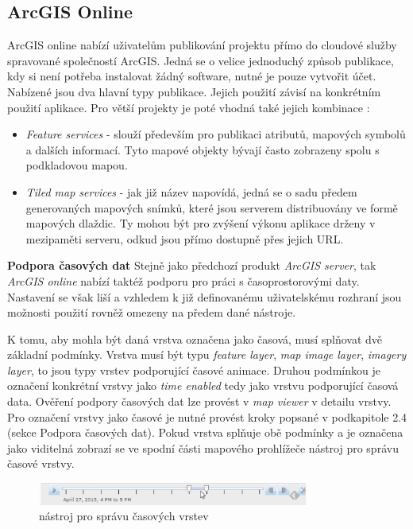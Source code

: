 \subsection{ArcGIS Online}

ArcGIS online nabízí uživatelům publikování projektu přímo do cloudové služby spravované společností ArcGIS. Jedná se o velice jednoduchý způsob publikace, kdy si není potřeba instalovat žádný software, nutné je pouze vytvořit účet. Nabízené jsou dva hlavní typy publikace. Jejich použití závisí na konkrétním použití aplikace. Pro větší projekty je poté vhodná také jejich kombinace \cite{arcgis-publishing-service}:
\begin{itemize}
	\item \textit{Feature services} - slouží především pro publikaci atributů, mapových symbolů a dalších informací. Tyto mapové objekty bývají často zobrazeny spolu s podkladovou mapou.
	\item \textit{Tiled map services} - jak již název napovídá, jedná se o sadu předem generovaných mapových snímků, které jsou serverem distribuovány ve formě mapových dlaždic. Ty mohou být pro zvýšení výkonu aplikace drženy v mezipaměti serveru, odkud jsou přímo dostupně přes jejich URL.
\end{itemize}

\bigskip
\noindent
\textbf{Podpora časových dat}
Stejně jako předchozí produkt \textit{ArcGIS server}, tak \textit{ArcGIS online} nabízí taktéž podporu pro práci s časoprostorovými daty. Nastavení se však liší a vzhledem k již definovanému uživatelskému rozhraní jsou možnosti použití rovněž omezeny na předem dané nástroje.

K tomu, aby mohla být daná vrstva označena jako časová, musí splňovat dvě základní podmínky. Vrstva musí být typu \textit{feature layer}, \textit{map image layer}, \textit{imagery layer}, to jsou typy vrstev podporující časové animace. Druhou podmínkou je označení konkrétní vrstvy jako \textit{time enabled} tedy jako vrstvu podporující časová data. Ověření podpory časových dat lze provést v \textit{map viewer} v detailu vrstvy. Pro označení vrstvy jako časové je nutné provést kroky popsané v podkapitole 2.4 (sekce Podpora časových dat). Pokud vrstva splňuje obě podmínky a je označena jako viditelná zobrazí se ve spodní části mapového prohlížeče nástroj pro správu časové vrstvy.

\begin{figure}[h!]
	\centering
	\includegraphics[width=0.8\textwidth]{../img/arcgis-online-time-slider.png}
	\caption{nástroj pro správu časových vrstev}
	\label{fig:arcgis-time-settings}
\end{figure}

